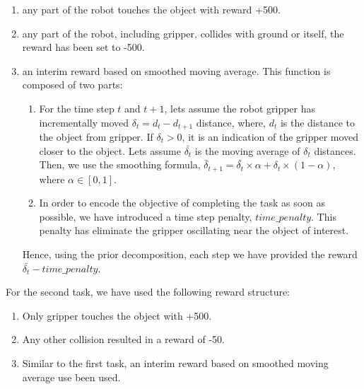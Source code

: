 \documentclass[10pt,journal,compsoc]{IEEEtran}
\begin{document}
\begin{enumerate}
\item any part of the robot touches the object with reward +500.
\item any part of the robot, including gripper, collides with ground or itself, the reward has been set to -500.
\item an interim reward based on smoothed moving average. This function is composed of two parts:
\begin{enumerate}
\item For the time step $t$ and $t+1$, lets assume the robot gripper has incrementally moved $\delta_t=d_t - d_{t+1}$ distance, where, $d_t$ is the distance to the object from gripper.  If $\delta_t > 0$, it is an indication of the gripper moved closer to the object. Lets assume $\bar{\delta_t}$ is the moving average of $\delta_t$ distances. Then, we use the smoothing formula, $\bar{\delta}_{t+1} = \bar{\delta_{t}}\times \alpha + \delta_t \times (1 -  \alpha)$, where $\alpha \in [0, 1]$.
\item In order to encode the objective of completing the task as soon as possible, we have introduced a time step penalty, $time\_penalty$. This penalty has eliminate the gripper oscillating near the object of interest.  
\end{enumerate} Hence, using the prior decomposition, each step we have provided the reward $\bar{\delta_t} - time\_penalty$.  
\end{enumerate}

For the second task, we have used the following reward structure:

\begin{enumerate}
\item Only gripper touches the object with +500.
\item Any other collision resulted in a reward of -50. 
\item Similar to the first task, an interim reward based on smoothed moving average use been used. 
\end{enumerate}

%
%
%
%
%
%
\end{document}
